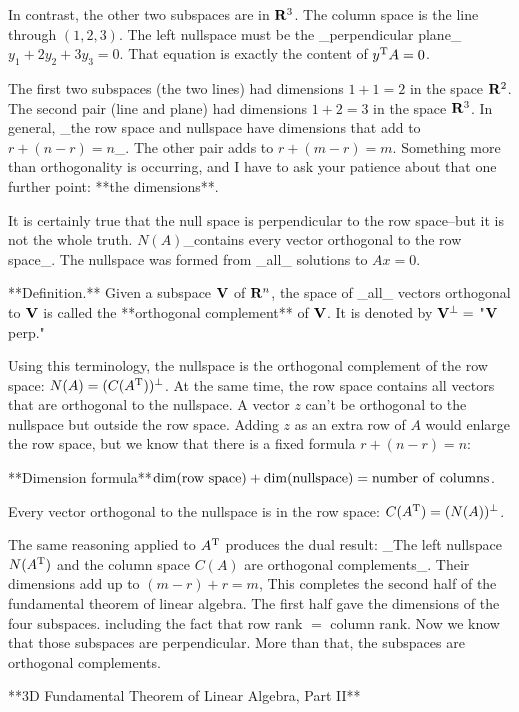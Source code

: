 In contrast, the other two subspaces are in \({\bf R}^{3}\). The column space is the line through \((1,2,3)\). The left nullspace must be the _perpendicular plane_\(y_{1}+2y_{2}+3y_{3}=0\). That equation is exactly the content of \(y^{\rm T}A=0\).

The first two subspaces (the two lines) had dimensions \(1+1=2\) in the space \({\bf R}^{2}\). The second pair (line and plane) had dimensions \(1+2=3\) in the space \({\bf R}^{3}\). In general, _the row space and nullspace have dimensions that add to \(r+(n-r)=n\)_. The other pair adds to \(r+(m-r)=m\). Something more than orthogonality is occurring, and I have to ask your patience about that one further point: **the dimensions**.

It is certainly true that the null space is perpendicular to the row space--but it is not the whole truth. \(N(A)\)_contains every vector orthogonal to the row space_. The nullspace was formed from _all_ solutions to \(Ax=0\).

**Definition.** Given a subspace \({\bf V}\) of \({\bf R}^{n}\), the space of _all_ vectors orthogonal to \({\bf V}\) is called the **orthogonal complement** of \({\bf V}\). It is denoted by \({\bf V}^{\perp}=\) "\({\bf V}\) perp."

Using this terminology, the nullspace is the orthogonal complement of the row space: \(N(A)=(C(A^{\rm T}))^{\perp}\). At the same time, the row space contains all vectors that are orthogonal to the nullspace. A vector \(z\) can't be orthogonal to the nullspace but outside the row space. Adding \(z\) as an extra row of \(A\) would enlarge the row space, but we know that there is a fixed formula \(r+(n-r)=n\):

**Dimension formula**\(\dim({\rm row\ space})+\dim({\rm nullspace})={\rm number\ of\ columns}\).

Every vector orthogonal to the nullspace is in the row space: \(C(A^{\rm T})=(N(A))^{\perp}\).

The same reasoning applied to \(A^{\rm T}\) produces the dual result: _The left nullspace \(N(A^{\rm T})\) and the column space \(C(A)\) are orthogonal complements_. Their dimensions add up to \((m-r)+r=m\), This completes the second half of the fundamental theorem of linear algebra. The first half gave the dimensions of the four subspaces. including the fact that row rank \(=\) column rank. Now we know that those subspaces are perpendicular. More than that, the subspaces are orthogonal complements.

**3D Fundamental Theorem of Linear Algebra, Part II**

